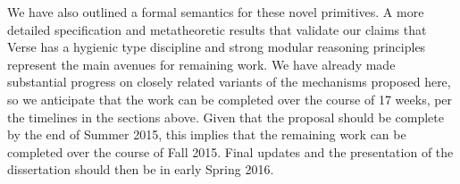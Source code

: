 We have also outlined a formal semantics for these novel primitives. A more detailed specification and metatheoretic results that validate our claims that Verse has a hygienic type discipline and strong modular reasoning principles represent the main avenues for remaining work. We have already made substantial progress on closely related variants of the mechanisms proposed here, so we anticipate that the work can be completed over the course of 17 weeks, per the timelines in the sections above. Given that the proposal should be complete by the end of Summer 2015, this implies that the remaining work can be completed over the course of Fall 2015. Final updates and the presentation of the dissertation should then be in early Spring 2016.








